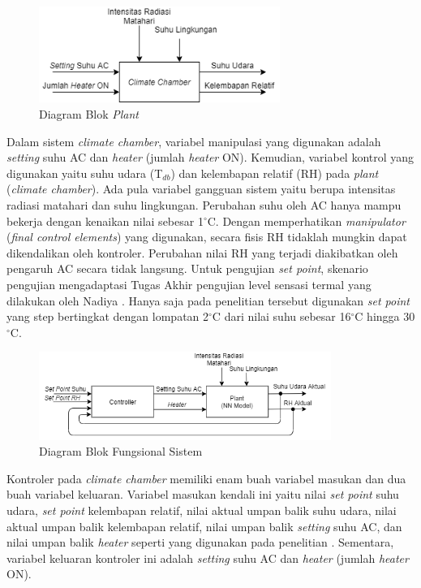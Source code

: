 \begin{figure}[!h]
	\centering
	\includegraphics[width=0.7\textwidth]{figures/BlokDiagramPlant}
	\caption{Diagram Blok \textit{Plant}}
	\label{fig:5:DiagramBlokPlant}
\end{figure}
\vspace{1em}

Dalam sistem \textit{climate chamber}, variabel manipulasi yang digunakan adalah \textit{setting} suhu AC dan \textit{heater} (jumlah \textit{heater} ON). Kemudian, variabel kontrol yang digunakan yaitu suhu udara (T$_{db}$) dan kelembapan relatif (RH) pada \textit{plant} (\textit{climate chamber}). Ada pula variabel gangguan sistem yaitu berupa intensitas radiasi matahari dan suhu lingkungan. Perubahan suhu oleh AC hanya mampu bekerja dengan kenaikan nilai sebesar 1$^\circ$C. Dengan memperhatikan \textit{manipulator} (\textit{final control elements}) yang digunakan, secara fisis RH tidaklah mungkin dapat dikendalikan oleh kontroler. Perubahan nilai RH yang terjadi diakibatkan oleh pengaruh AC secara tidak langsung. Untuk pengujian \textit{set point}, skenario pengujian mengadaptasi Tugas Akhir pengujian level sensasi termal yang dilakukan oleh Nadiya \cite{skripsiMuna}. Hanya saja pada penelitian tersebut digunakan \textit{set point} yang step bertingkat dengan lompatan 2$^{\circ}$C dari nilai suhu sebesar 16$^{\circ}$C hingga 30$^{\circ}$C.

\begin{figure}[!h]
	\centering
	\includegraphics[width=0.85\textwidth]{figures/DiagramBlokFungsionalSistem}
	\caption{Diagram Blok Fungsional Sistem}
	\label{fig:5:DiagramBlokSistem}
\end{figure}

Kontroler pada \textit{climate chamber} memiliki enam buah variabel masukan dan dua buah variabel keluaran. Variabel masukan kendali ini yaitu nilai \textit{set point} suhu udara, \textit{set point} kelembapan relatif, nilai aktual umpan balik suhu udara, nilai aktual umpan balik kelembapan relatif, nilai umpan balik \textit{setting} suhu AC, dan nilai umpan balik \textit{heater} seperti yang digunakan pada penelitian \cite{paper22JJkim, paper22SKJung, paper22JanDrgona}. Sementara, variabel keluaran kontroler ini adalah \textit{setting} suhu AC dan \textit{heater} (jumlah \textit{heater} ON).

